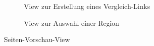 \documentclass[nomenclature, oneside, 150]{HSMW-Thesis}
\begin{document}
\begin{figure}[th]
\begin{subfigure}[t]{0.3\textwidth}
        			\caption{View zur Erstellung eines Vergleich-Links}
        			\label{fig:l2}
    			\end{subfigure}
    			\begin{subfigure}[t]{0.3\textwidth}
        			\caption{View zur Auswahl einer Region}
        			\label{fig:l3}
    			\end{subfigure}
    			\caption{Seiten-Vorschau-View}
				\label{fig:link1}
			\end{figure}
		
\end{document}
